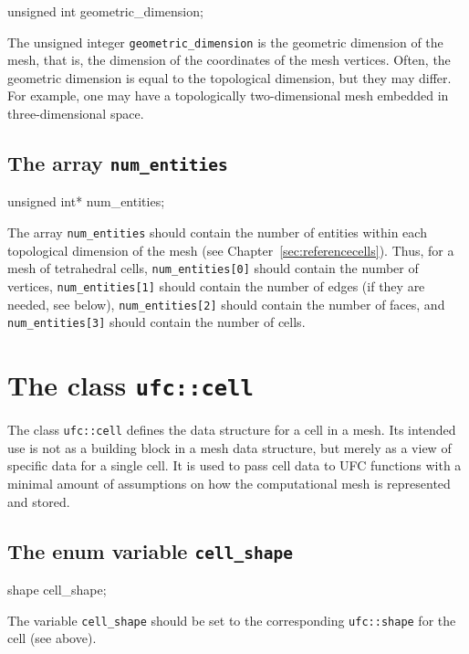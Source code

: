 \begin{code}
unsigned int geometric_dimension;
\end{code}

The unsigned integer \texttt{geometric\_dimension} is the geometric
dimension of the mesh, that is, the dimension of the coordinates of
the mesh vertices.  Often, the geometric dimension is equal to the
topological dimension, but they may differ. For example, one may have
a topologically two-dimensional mesh embedded in three-dimensional
space.

\subsection{The array \texttt{num\_entities}}

\begin{code}
unsigned int* num_entities;
\end{code}

The array \texttt{num\_entities} should contain the number of entities
within each topological dimension of the mesh (see
Chapter~\ref{sec:referencecells}). Thus, for a mesh of tetrahedral
cells, \texttt{num\_entities[0]} should contain the number of
vertices, \texttt{num\_entities[1]} should contain the number of edges
(if they are needed, see below), \texttt{num\_entities[2]} should
contain the number of faces, and \texttt{num\_entities[3]} should
contain the number of cells.

\section{The class \texttt{ufc::cell}}

The class \texttt{ufc::cell} defines the data structure for a cell in
a mesh. Its intended use is not as a building block in a mesh data
structure, but merely as a view of specific data for a single cell.
It is used to pass cell data to UFC functions with a minimal amount of
assumptions on how the computational mesh is represented and stored.

\subsection{The enum variable \texttt{cell\_shape}}

\begin{code}
shape cell_shape;
\end{code}

The variable \texttt{cell\_shape} should be set to the corresponding
\texttt{ufc::shape} for the cell (see above).

